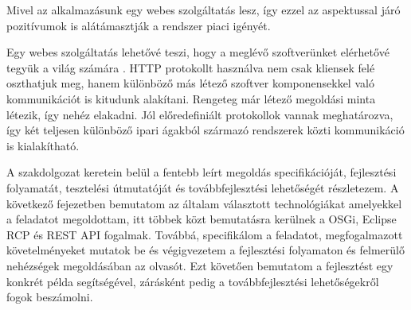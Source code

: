 Mivel az alkalmazásunk egy webes szolgáltatás lesz, így ezzel az aspektussal járó pozitívumok is alátámasztják a rendszer piaci igényét.

Egy webes szolgáltatás lehetővé teszi, hogy a meglévő szoftverünket elérhetővé tegyük a világ számára \cite{tutorialspoint}. HTTP protokollt használva nem csak kliensek felé oszthatjuk meg, hanem különböző más létező szoftver komponensekkel való kommunikációt is kitudunk alakítani.
Rengeteg már létező megoldási minta létezik, így nehéz elakadni. Jól előredefiniált protokollok vannak meghatározva, így két teljesen különböző ipari ágakból származó rendszerek közti kommunikáció is kialakítható.


A szakdolgozat keretein belül a fentebb leírt megoldás specifikációját, fejlesztési folyamatát, tesztelési útmutatóját és továbbfejlesztési lehetőségét részletezem.
A következő fejezetben bemutatom az általam választott technológiákat amelyekkel a feladatot megoldottam, itt többek közt bemutatásra kerülnek a OSGi, Eclipse RCP és REST API fogalmak. Továbbá, specifikálom a feladatot, megfogalmazott követelményeket mutatok be és végigvezetem a fejlesztési folyamaton és felmerülő nehézségek megoldásában az olvasót. Ezt követően bemutatom a fejlesztést egy konkrét példa segítségével, zárásként pedig a továbbfejlesztési lehetőségekről fogok beszámolni.





















